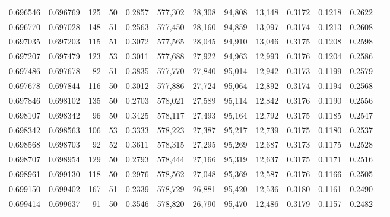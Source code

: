 \begin{tabular}{rrrrrrrrrrrrr}
0.696546 & 0.696769 &   125 &  50 &                                     0.2857 & 577,302 &  28,308 &  94,808 &  13,148 & 0.3172 & 0.1218 & 0.2622 \\
0.696770 & 0.697028 &   148 &  51 &                                     0.2563 & 577,450 &  28,160 &  94,859 &  13,097 & 0.3174 & 0.1213 & 0.2608 \\
0.697035 & 0.697203 &   115 &  51 &                                     0.3072 & 577,565 &  28,045 &  94,910 &  13,046 & 0.3175 & 0.1208 & 0.2598 \\
0.697207 & 0.697479 &   123 &  53 &                                     0.3011 & 577,688 &  27,922 &  94,963 &  12,993 & 0.3176 & 0.1204 & 0.2586 \\
0.697486 & 0.697678 &    82 &  51 &                                     0.3835 & 577,770 &  27,840 &  95,014 &  12,942 & 0.3173 & 0.1199 & 0.2579 \\
0.697678 & 0.697844 &   116 &  50 &                                     0.3012 & 577,886 &  27,724 &  95,064 &  12,892 & 0.3174 & 0.1194 & 0.2568 \\
0.697846 & 0.698102 &   135 &  50 &                                     0.2703 & 578,021 &  27,589 &  95,114 &  12,842 & 0.3176 & 0.1190 & 0.2556 \\
0.698107 & 0.698342 &    96 &  50 &                                     0.3425 & 578,117 &  27,493 &  95,164 &  12,792 & 0.3175 & 0.1185 & 0.2547 \\
0.698342 & 0.698563 &   106 &  53 &                                     0.3333 & 578,223 &  27,387 &  95,217 &  12,739 & 0.3175 & 0.1180 & 0.2537 \\
0.698568 & 0.698703 &    92 &  52 &                                     0.3611 & 578,315 &  27,295 &  95,269 &  12,687 & 0.3173 & 0.1175 & 0.2528 \\
0.698707 & 0.698954 &   129 &  50 &                                     0.2793 & 578,444 &  27,166 &  95,319 &  12,637 & 0.3175 & 0.1171 & 0.2516 \\
0.698961 & 0.699130 &   118 &  50 &                                     0.2976 & 578,562 &  27,048 &  95,369 &  12,587 & 0.3176 & 0.1166 & 0.2505 \\
0.699150 & 0.699402 &   167 &  51 &                                     0.2339 & 578,729 &  26,881 &  95,420 &  12,536 & 0.3180 & 0.1161 & 0.2490 \\
0.699414 & 0.699637 &    91 &  50 &                                     0.3546 & 578,820 &  26,790 &  95,470 &  12,486 & 0.3179 & 0.1157 & 0.2482 \\

\end{tabular}

